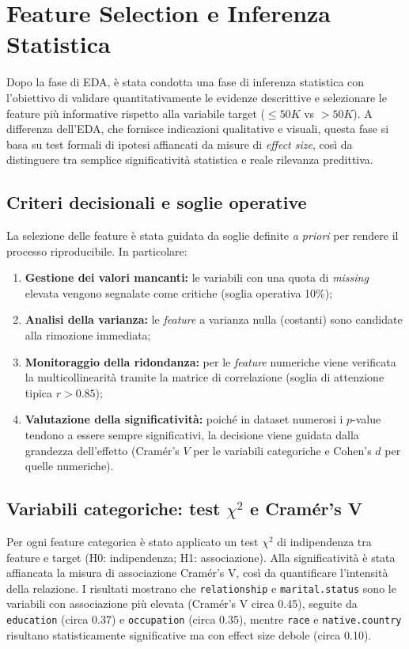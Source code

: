 \documentclass[a4paper,11pt]{article}
\begin{document}
\newpage
\section{Feature Selection e Inferenza Statistica}

Dopo la fase di EDA, è stata condotta una fase di inferenza statistica con l’obiettivo di validare quantitativamente le evidenze descrittive e selezionare le feature più informative rispetto alla variabile target (\(\leq 50K\) vs \(>50K\)). 
A differenza dell’EDA, che fornisce indicazioni qualitative e visuali, questa fase si basa su test formali di ipotesi affiancati da misure di \textit{effect size}, così da distinguere tra semplice significatività statistica e reale rilevanza predittiva. 

\subsection{Criteri decisionali e soglie operative}
La selezione delle feature è stata guidata da soglie definite \textit{a priori} per rendere il processo riproducibile. In particolare:

\begin{enumerate}[label=(\roman*)]
    \item \textbf{Gestione dei valori mancanti:} le variabili con una quota di \textit{missing} elevata vengono segnalate come critiche (soglia operativa 10\%);
    \item \textbf{Analisi della varianza:} le \textit{feature} a varianza nulla (costanti) sono candidate alla rimozione immediata;
    \item \textbf{Monitoraggio della ridondanza:} per le \textit{feature} numeriche viene verificata la multicollinearità tramite la matrice di correlazione (soglia di attenzione tipica $r > 0.85$);
    \item \textbf{Valutazione della significatività:} poiché in dataset numerosi i $p$-value tendono a essere sempre significativi, la decisione viene guidata dalla grandezza dell'effetto (Cramér's $V$ per le variabili categoriche e Cohen's $d$ per quelle numeriche).
\end{enumerate}


\subsection{Variabili categoriche: test \(\chi^2\) e Cramér’s V}
Per ogni feature categorica è stato applicato un test \(\chi^2\) di indipendenza tra feature e target (H0: indipendenza; H1: associazione). 
Alla significatività è stata affiancata la misura di associazione Cramér’s V, così da quantificare l’intensità della relazione. 
I risultati mostrano che \texttt{relationship} e \texttt{marital.status} sono le variabili con associazione più elevata (Cramér’s V circa 0.45), seguite da \texttt{education} (circa 0.37) e \texttt{occupation} (circa 0.35), mentre \texttt{race} e \texttt{native.country} risultano statisticamente significative ma con effect size debole (circa 0.10). 
\end{document}
